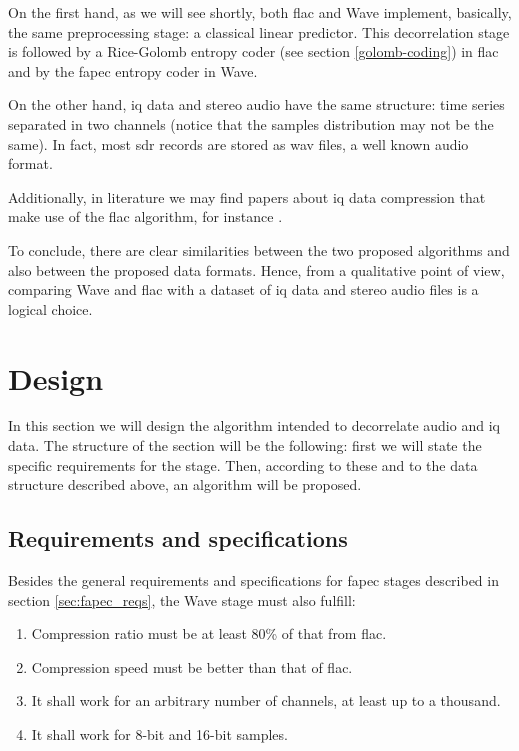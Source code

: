 On the first hand, as we will see shortly, both \acrshort{flac} and Wave implement, basically, the same preprocessing stage: a classical linear predictor. This decorrelation stage is followed by a Rice-Golomb entropy coder (see section \ref{golomb-coding}) in \acrshort{flac} and by the \acrshort{fapec} entropy coder in Wave.

On the other hand, \acrshort{iq} data and stereo audio have the same structure: time series separated in two channels (notice that the samples distribution may not be the same). In fact, most \acrshort{sdr} records are stored as \acrshort{wav} files, a well known audio format.

Additionally, in literature we may find papers about \acrshort{iq} data compression that make use of the \acrshort{flac} algorithm, for instance \parencite{IQFlac}.

To conclude, there are clear similarities between the two proposed algorithms and also between the proposed data formats. Hence, from a qualitative point of view, comparing Wave and \acrshort{flac} with a dataset of \acrshort{iq} data and stereo audio files is a logical choice.

\section{Design}
In this section we will design the algorithm intended to decorrelate audio and \acrshort{iq} data. The structure of the section will be the following: first we will state the specific requirements for the stage. Then, according to these and to the data structure described above, an algorithm will be proposed.

\subsection{Requirements and specifications}
Besides the general requirements and specifications for \acrshort{fapec} stages described in section \ref{sec:fapec_reqs}, the Wave stage must also fulfill:
\begin{enumerate}
	\item Compression ratio must be at least 80\% of  that from \acrshort{flac}.
	\item Compression speed must be better than that of \acrshort{flac}.
	\item It shall work for an arbitrary number of channels, at least up to a thousand.
	\item It shall work for 8-bit and 16-bit samples.
\end{enumerate}

